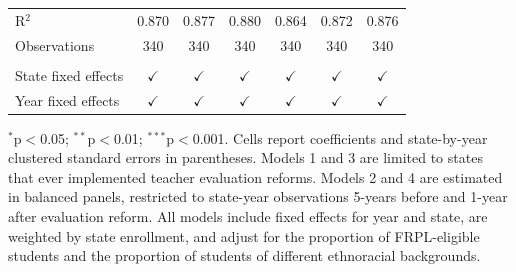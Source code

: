 \begin{table}[!htbp]
\begin{tabular}{lcccccc}
       \\
      R$^2$                                   & 0.870         & 0.877         & 0.880         & 0.864         & 0.872         & 0.876\\  
      Observations                            & 340           & 340           & 340           & 340           & 340           & 340\\  
       \\
      State fixed effects                     & $\checkmark$  & $\checkmark$  & $\checkmark$  & $\checkmark$  & $\checkmark$  & $\checkmark$\\   
      Year fixed effects                      & $\checkmark$  & $\checkmark$  & $\checkmark$  & $\checkmark$  & $\checkmark$  & $\checkmark$\\   
      \bottomrule
   \end{tabular}
   
   \par \raggedright 
   $^{*}$p$<$0.05; $^{**}$p$<$0.01; $^{***}$p$<$0.001. Cells report coefficients and state-by-year clustered standard errors in parentheses. Models 1 and 3 are limited to states that ever implemented teacher evaluation reforms. Models 2 and 4 are estimated in balanced panels, restricted to state-year observations 5-years before and 1-year after evaluation reform. All models include fixed effects for year and state, are weighted by state enrollment, and adjust for the proportion of FRPL-eligible students and the proportion of students of different ethnoracial backgrounds.
\end{table}


